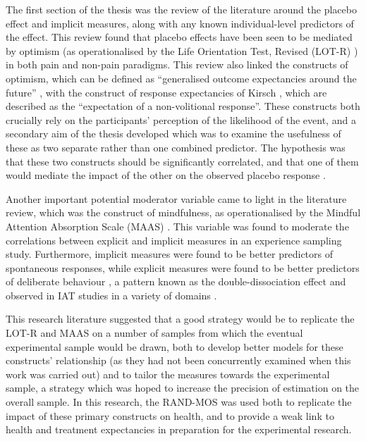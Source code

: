 The first section of the thesis was the review of the literature
around the placebo effect and implicit measures, along with any known
individual-level predictors of the effect. This review found that
placebo effects have been seen to be mediated by optimism (as
operationalised by the Life Orientation Test, Revised (LOT-R)
\cite{Scheier1994}) \cite{Geers2005,morton2009reproducibility} in both
pain and non-pain paradigms. This review also linked the constructs of
optimism, which can be defined as ``generalised outcome expectancies
around the future'' \cite{Carver2010}, with the construct of response
expectancies of Kirsch \cite{Kirsch1985,Kirsch1997}, which are
described as the ``expectation of a non-volitional response''. These
constructs both crucially rely on the participants' perception of the
likelihood of the event, and a secondary aim of the thesis developed
which was to examine the usefulness of these as two separate rather
than one combined predictor. The hypothesis was that these two
constructs should be significantly correlated, and that one of them
would mediate the impact of the other on the observed placebo response
\cite{Geers2005}.

Another important potential moderator variable came to light in the
literature review, which was the construct of mindfulness, as
operationalised by the Mindful Attention Absorption Scale (MAAS)
\cite{brown2003benefits}. This variable was found to moderate the
correlations between explicit and implicit measures in an experience
sampling study. Furthermore, implicit measures were found to be better
predictors of spontaneous responses, while explicit measures were
found to be better predictors of deliberate behaviour
\cite{Levesque2007}, a pattern known as the double-dissociation effect
and observed in IAT studies in a variety of domains
\cite{Asendorpf2002,Perugini2005,Grumm2007,Steffens2006}.

This research literature suggested that a good strategy would be to
replicate the LOT-R and MAAS on a number of samples from which the
eventual experimental sample would be drawn, both to develop better
models for these constructs' relationship (as they had not been
concurrently examined when this work was carried out) and to tailor
the measures towards the experimental sample, a strategy which was
hoped to increase the precision of estimation on the overall sample.
In this research, the RAND-MOS was used both to replicate the impact
of these primary constructs on health, and to provide a weak link to
health and treatment expectancies in preparation for the experimental
research.

